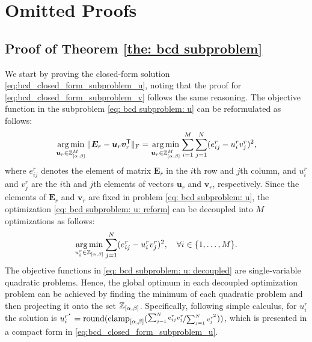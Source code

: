 
\section{Omitted Proofs}
\subsection{Proof of Theorem \ref{the: bcd subproblem}} \label{app: proof:1}
We start by proving the closed-form solution \eqref{eq:bcd_closed_form_subproblem_u}, noting that the proof for \eqref{eq:bcd_closed_form_subproblem_v} follows the same reasoning. 
The objective function in the subproblem \eqref{eq: bcd subproblem: u} can be reformulated as follows:
\begin{align}
    \operatorname*{arg\,min}_{\bm{u}_r \in \mathbb Z_{[\alpha,\beta]}^M} \|\bm{E}_r - \bm{u}_r \bm{v}_r^\mathsf{T}\|_{\rm F} 
    = \operatorname*{arg\,min}_{\bm{u}_r \in \mathbb Z_{[\alpha,\beta]}^M}\sum_{i=1}^M \sum_{j=1}^N (e_{ij}^r - u_i^r v_j^r)^2,
    \label{eq: bcd subproblem: u: reform}
\end{align}
where $e_{ij}^r$ denotes the element of matrix $\bm{E}_r$ in the $i$th row and $j$th column, and $u_i^r$ and $v_j^r$ are the $i$th and $j$th elements of vectors $\bm{u}_r$ and $\bm{v}_r$, respectively.
Since the elements of $\bm{E}_r$ and $\bm v_r$ are fixed in problem \eqref{eq: bcd subproblem: u}, the optimization \eqref{eq: bcd subproblem: u: reform} can be decoupled into $M$ optimizations as follows:
\begin{align}
    \operatorname*{arg\,min}_{u^r_i \in \mathbb Z_{[\alpha,\beta]}} \sum_{j=1}^N (e_{ij}^r - u_i^r v_j^r)^2, \quad \forall i\in\{1,\dots,M\}.
    \label{eq: bcd subproblem: u: decoupled}
\end{align}
The objective functions in \eqref{eq: bcd subproblem: u: decoupled} are single-variable quadratic problems. Hence, the global optimum in each decoupled optimization problem can be achieved by finding the minimum of each quadratic problem and then projecting it onto the set $\mathbb Z_{[\alpha,\beta]}$. Specifically, following simple calculus, for $u^r_i$ the solution is $u^{r^\star}_i = \operatorname{round}(\operatorname{clamp}_{[\alpha,\beta]}(\nicefrac{\sum_{j=1}^N e_{ij}^r v_j^r}{\sum_{j=1}^N v_j^{r^2}}))$, which is presented in a compact form in \eqref{eq:bcd_closed_form_subproblem_u}.


